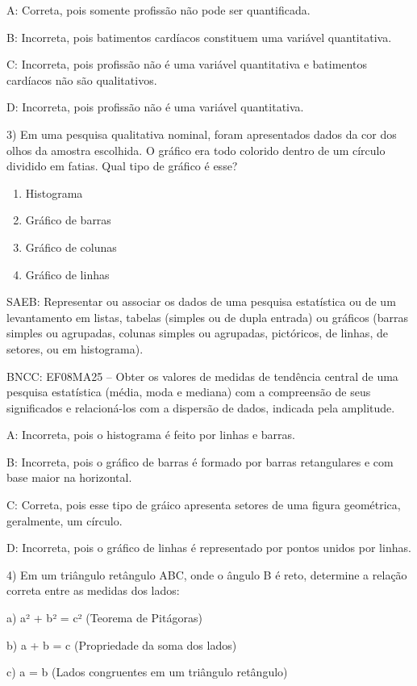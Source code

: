 A: Correta, pois somente profissão não pode ser quantificada.

B: Incorreta, pois batimentos cardíacos constituem uma variável
quantitativa.

C: Incorreta, pois profissão não é uma variável quantitativa e
batimentos cardíacos não são qualitativos.

D: Incorreta, pois profissão não é uma variável quantitativa.

3) Em uma pesquisa qualitativa nominal, foram apresentados dados da cor
dos olhos da amostra escolhida. O gráfico era todo colorido dentro de um
círculo dividido em fatias. Qual tipo de gráfico é esse?

\begin{enumerate}
\def\labelenumi{\alph{enumi}.}
\item
  Histograma
\item
  Gráfico de barras
\item
  Gráfico de colunas
\item
  Gráfico de linhas~
\end{enumerate}

SAEB: Representar ou associar os dados de uma pesquisa estatística ou de
um levantamento em listas, tabelas (simples ou de dupla entrada) ou
gráficos (barras simples ou agrupadas, colunas simples ou agrupadas,
pictóricos, de linhas, de setores, ou em histograma).

BNCC: EF08MA25 -- Obter os valores de medidas de tendência central de
uma pesquisa estatística (média, moda e mediana) com a compreensão de
seus significados e relacioná-los com a dispersão de dados, indicada
pela amplitude.

A: Incorreta, pois o histograma é feito por linhas e barras.

B: Incorreta, pois o gráfico de barras é formado por barras retangulares
e com base maior na horizontal.

C: Correta, pois esse tipo de gráico apresenta setores de uma figura
geométrica, geralmente, um círculo.

D: Incorreta, pois o gráfico de linhas é representado por pontos unidos
por linhas.

4) Em um triângulo retângulo ABC, onde o ângulo B é reto, determine a
relação correta entre as medidas dos lados:

a) a² + b² = c² (Teorema de Pitágoras)

b) a + b = c (Propriedade da soma dos lados)

c) a = b (Lados congruentes em um triângulo retângulo)

